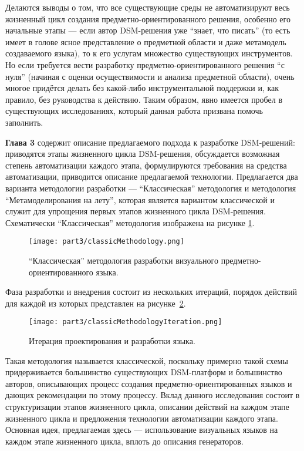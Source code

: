 Делаются выводы о том, что все существующие среды не автоматизируют весь жизненный цикл
создания предметно-ориентированного решения, особенно его начальные этапы --- если автор DSM-решения уже 
"`знает, что писать"' (то есть имеет в голове ясное представление о предметной области 
и даже метамодель создаваемого языка), то к его услугам множество существующих инструментов. 
Но если требуется вести разработку предметно-ориентированного решения "`с нуля"' (начиная 
с оценки осуществимости и анализа предметной области), очень многое придётся делать 
без какой-либо инструментальной поддержки и, как правило, без руководства к действию.
Таким образом, явно имеется пробел в существующих исследованиях, который данная работа
призвана помочь заполнить.

\textbf{Глава 3} содержит описание предлагаемого подхода к разработке 
DSM-решений: приводятся этапы жизненного цикла DSM-решения, обсуждается 
возможная степень автоматизации каждого этапа, формулируются требования на 
средства автоматизации, приводится описание предлагаемой технологии. Предлагается
два варианта методологии разработки --- "`Классическая"' методология и методология "`Метамоделирования
на лету"', которая является вариантом классической и служит для упрощения первых этапов
жизненного цикла DSM-решения. Схематически "`Классическая"' методология изображена на рисунке
\ref{classicMethodology}.

\begin{figure} [ht]
	\begin{center}
		\texttt{[image: part3/classicMethodology.png]}
		\caption{"`Классическая"' методология разработки визуального предметно-ориентированного языка.}
		\label{classicMethodology}
	\end{center}
\end{figure}

Фаза разработки и внедрения состоит из нескольких итераций, порядок действий для каждой 
из которых представлен на рисунке~\ref{classicMethodologyIteration}. 

\begin{figure} [ht]
	\begin{center}
		\texttt{[image: part3/classicMethodologyIteration.png]}
		\caption{Итерация проектирования и разработки языка.}
		\label{classicMethodologyIteration}
	\end{center}
\end{figure}

Такая методология называется классической, поскольку примерно такой схемы придерживается
большинство существующих DSM-платформ и большинство авторов, описывающих процесс создания
предметно-ориентированных языков и дающих рекомендации по этому процессу. Вклад данного 
исследования состоит в структуризации этапов жизненного цикла, описании действий на 
каждом этапе жизненного цикла и предложения технологии автоматизации каждого этапа.
Основная идея, предлагаемая здесь --- использование визуальных языков на каждом
этапе жизненного цикла, вплоть до описания генераторов.

